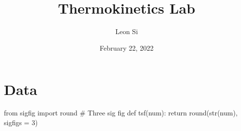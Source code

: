 \documentclass[12pt, notitlepage, letterpaper]{report}
\title{Thermokinetics Lab}
\author{Leon Si}
\date{February 22, 2022}
\begin{document}
\maketitle




\section*{Data}

\begin{pycode}
from sigfig import round
# Three sig fig
def tsf(num):
	return round(str(num), sigfigs = 3)
\end{pycode}
\end{document}
